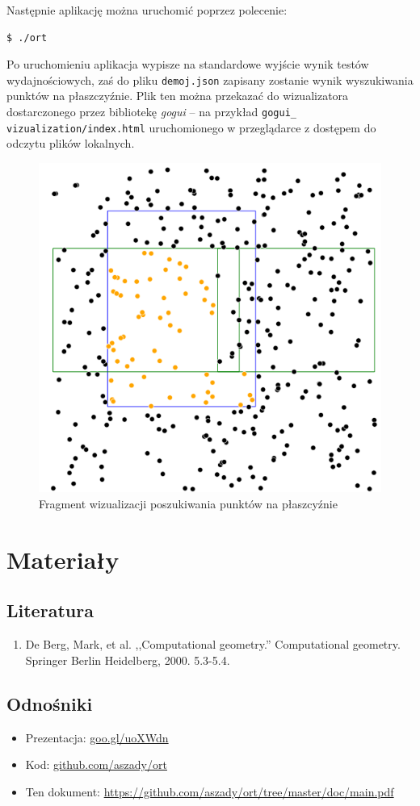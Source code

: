 \documentclass[a4paper]{article}
\begin{document}
Następnie aplikację można uruchomić poprzez polecenie:
\begin{lstlisting}[language=bash]
  $ ./ort
\end{lstlisting}

Po uruchomieniu aplikacja wypisze na standardowe wyjście wynik testów wydajnościowych, zaś do pliku \texttt{demoj.json} zapisany zostanie wynik wyszukiwania punktów na płaszczyźnie. Plik ten można przekazać do wizualizatora dostarczonego przez bibliotekę \emph{gogui} -- na przykład \texttt{gogui\_ vizualization/index.html} uruchomionego w przeglądarce z dostępem do odczytu plików lokalnych.

\begin{figure}[H]
\centering
\includegraphics[scale=0.4]{Images/viz.png}
\caption{Fragment wizualizacji poszukiwania punktów na płaszcyźnie}\label{fig:viz}
\end{figure}

\section{Materiały}
\subsection*{Literatura}
\begin{enumerate}[noitemsep]
\item De Berg, Mark, et al. ,,Computational geometry.'' Computational geometry. Springer Berlin Heidelberg, 2000. 5.3-5.4.
\end{enumerate}
\subsection*{Odnośniki}
\begin{itemize}[noitemsep]
\item Prezentacja: \url{goo.gl/uoXWdn}
\item Kod: \url{github.com/aszady/ort}
\item Ten dokument: \url{https://github.com/aszady/ort/tree/master/doc/main.pdf}
\end{itemize}
\end{document}
